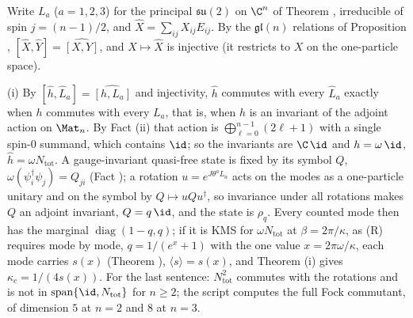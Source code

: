Write $L_{a}$ ($a = 1, 2, 3$) for the principal $\mathfrak{su}(2)$ on $\C^{n}$ of Theorem , irreducible of spin $j = (n-1)/2$, and $\hat{X} = \sum_{ij}X_{ij}E_{ij}$. By the $\mathfrak{gl}(n)$ relations of Proposition , $[\hat{X}, \hat{Y}] = \widehat{[X, Y]}$, and $X \mapsto \hat{X}$ is injective (it restricts to $X$ on the one-particle space).

(i) By $[\hat{h}, \hat{L}_{a}] = \widehat{[h, L_{a}]}$ and injectivity, $\hat{h}$ commutes with every $\hat{L}_{a}$ exactly when $h$ commutes with every $L_{a}$, that is, when $h$ is an invariant of the adjoint action on $\Mat_{n}$. By Fact (ii) that action is $\bigoplus_{\ell=0}^{n-1}(2\ell+1)$ with a single spin-$0$ summand, which contains $\id$; so the invariants are $\C\,\id$ and $h = \omega\,\id$, $\hat{h} = \omega N_{\mathrm{tot}}$. A gauge-invariant quasi-free state is fixed by its symbol $Q$, $\omega(\psi_{i}^{\dagger}\psi_{j}) = Q_{ji}$ (Fact ); a rotation $u = e^{J\theta^{a}L_{a}}$ acts on the modes as a one-particle unitary and on the symbol by $Q \mapsto uQu^{\dagger}$, so invariance under all rotations makes $Q$ an adjoint invariant, $Q = q\,\id$, and the state is $\rho_{q}$. Every counted mode then has the marginal $\operatorname{diag}(1 - q, q)$; if it is KMS for $\omega N_{\mathrm{tot}}$ at $\beta = 2\pi/\kappa$, as (R) requires mode by mode, $q = 1/(e^{x} + 1)$ with the one value $x = 2\pi\omega/\kappa$, each mode carries $s(x)$ (Theorem ), $\langle s\rangle = s(x)$, and Theorem (i) gives $\kappa_{c} = 1/(4s(x))$. For the last sentence: $N_{\mathrm{tot}}^{2}$ commutes with the rotations and is not in $\operatorname{span}\{\id, N_{\mathrm{tot}}\}$ for $n \ge 2$; the script computes the full Fock commutant, of dimension $5$ at $n = 2$ and $8$ at $n = 3$.

